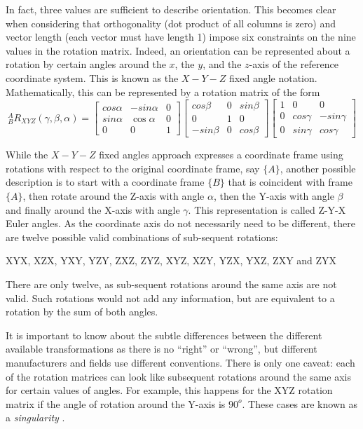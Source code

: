 In fact, three values are sufficient to describe orientation. This becomes clear when considering that orthogonality (dot product of all columns is zero) and vector length (each vector must have length 1) impose six constraints on the nine values in the rotation matrix. Indeed, an orientation can be represented about a rotation by certain angles around the $x$, the $y$, and the $z$-axis of the reference coordinate system. This is known as the $X-Y-Z$ fixed angle notation. Mathematically, this can be represented by a rotation matrix of the form
\begin{equation}
^A_BR_{XYZ}(\gamma,\beta,\alpha)=\left[\begin{array}{ccc}cos\alpha & -sin\alpha & 0\\sin\alpha & \cos\alpha & 0\\0 & 0 & 1\end{array}\right]\left[\begin{array}{ccc}cos\beta& 0 & sin\beta\\0 & 1 & 0\\-sin\beta & 0 & cos\beta\end{array}\right]\left[\begin{array}{ccc}1 & 0 & 0 \\ 0 & cos\gamma & -sin\gamma\\0 & sin\gamma & cos\gamma\end{array}\right]
\end{equation}

While the $X-Y-Z$ fixed angles approach expresses a coordinate frame using rotations with respect to the original coordinate frame, say $\{A\}$, another possible description is to start with a coordinate frame $\{B\}$ that is coincident with frame $\{A\}$, then rotate around the Z-axis with angle $ \alpha$, then the Y-axis with angle $ \beta$ and finally around the X-axis with angle $ \gamma$. This representation is called Z-Y-X Euler angles.
As the coordinate axis do not necessarily need to be different, there are twelve possible valid combinations of sub-sequent rotations:
\begin{center}
XYX, XZX, YXY, YZY, ZXZ, ZYZ, XYZ, XZY, YZX, YXZ, ZXY and ZYX
\end{center}
There are only twelve, as sub-sequent rotations around the same axis are not valid. Such rotations would not add any information, but are equivalent to a rotation by the sum of both angles. 

It is important to know about the subtle differences between the different available transformations as there is no ``right'' or ``wrong'', but different manufacturers and fields use different conventions. There is only one caveat: each of the rotation matrices can look like subsequent rotations around the same axis for certain values of angles. For example, this happens for the XYZ rotation matrix if the angle of rotation around the Y-axis is $90^o$. These cases are known as a \emph{singularity} .


